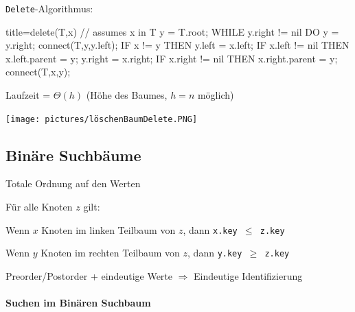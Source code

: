 \documentclass[
    ngerman,
    color=3b,
    load_common, %
    summary,
    boxarc,
]{tuda_summary}
\begin{document}
\texttt{Delete}-Algorithmus:\\
\begin{minipage}{0.6\textwidth-1.853pt}

    \begin{codeBlock}[autogobble]{title={delete(T,x) // assumes x in T}}
        y = T.root;
        WHILE y.right != nil DO
            y = y.right;
        connect(T,y,y.left);
        IF x != y THEN
            y.left = x.left;
            IF x.left != nil THEN
                x.left.parent = y;
            y.right = x.right;
            IF x.right != nil THEN
                x.right.parent = y;
            connect(T,x,y);
    \end{codeBlock}
    Laufzeit = $\Theta(h)$ (Höhe des Baumes, $h=n$ möglich)
\end{minipage}
\begin{minipage}{0.4\textwidth}
    \centering
    \texttt{[image: pictures/löschenBaumDelete.PNG]}
\end{minipage}


\clearpage
\subsection{Binäre Suchbäume}\label{Binaere Suchbaeume}
\begin{definition}
    \item Totale Ordnung auf den Werten
    \item Für alle Knoten $z$ gilt:
    \item[] Wenn $x$ Knoten im linken Teilbaum von $z$, dann \texttt{x.key $\leq$ z.key}
    \item[] Wenn $y$ Knoten im rechten Teilbaum von $z$, dann \texttt{y.key $\geq$ z.key}
    \item Preorder/Postorder + eindeutige Werte $\Rightarrow$ Eindeutige Identifizierung
\end{definition}

\paragraph{Suchen im Binären Suchbaum}\mbox{}\\
\end{document}
